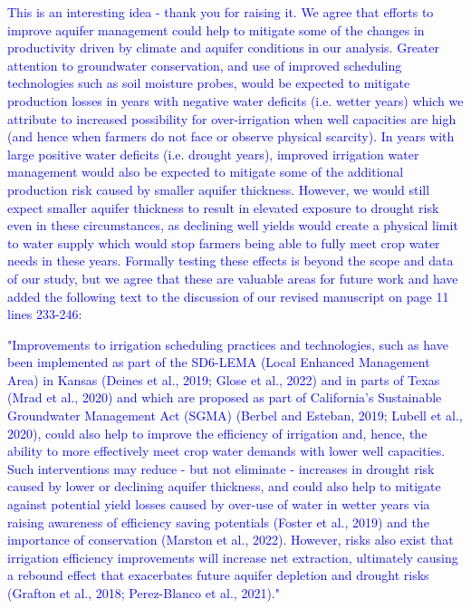 \documentclass[
]{article}
\begin{document}
\textcolor{blue}{This is an interesting idea - thank you for raising it. We agree that efforts to improve aquifer management could help to mitigate some of the changes in productivity driven by climate and aquifer conditions in our analysis. Greater attention to groundwater conservation, and use of improved scheduling technologies such as soil moisture probes, would be expected to mitigate production losses in years with negative water deficits (i.e. wetter years) which we attribute to increased possibility for over-irrigation when well capacities are high (and hence when farmers do not face or observe physical scarcity). In years with large positive water deficits (i.e. drought years), improved irrigation water management would also be expected to mitigate some of the additional production risk caused by smaller aquifer thickness. However, we would still expect smaller aquifer thickness to result in elevated exposure to drought risk even in these circumstances, as declining well yields would create a physical limit to water supply which would stop farmers being able to fully meet crop water needs in these years. Formally testing these effects is beyond the scope and data of our study, but we agree that these are valuable areas for future work and have added the following text to the discussion of our revised manuscript on page 11 lines 233-246:}

\textcolor{blue}{"Improvements to irrigation scheduling practices and technologies, such as have been implemented as part of the SD6-LEMA (Local Enhanced Management Area) in Kansas (Deines et al., 2019; Glose et al., 2022) and in parts of Texas (Mrad et al., 2020) and which are proposed as part of California's Sustainable Groundwater Management Act (SGMA) (Berbel and Esteban, 2019; Lubell et al., 2020), could also help to improve the efficiency of irrigation and, hence, the ability to more effectively meet crop water demands with lower well capacities. Such interventions may reduce - but not eliminate - increases in drought risk caused by lower or declining aquifer thickness, and could also help to mitigate against potential yield losses caused by over-use of water in wetter years via raising awareness of efficiency saving potentials (Foster et al., 2019) and the importance of conservation (Marston et al., 2022). However, risks also exist that irrigation efficiency improvements will increase net extraction, ultimately causing a rebound effect that exacerbates future aquifer depletion and drought risks (Grafton et al., 2018; Perez-Blanco et al., 2021)."}
\end{document}
